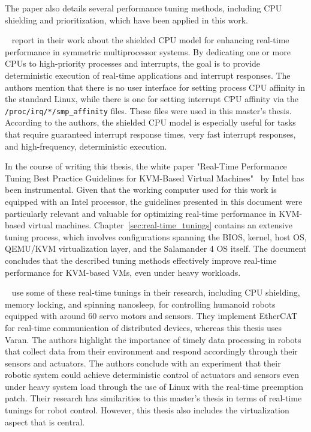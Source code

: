 \documentclass[MMR,Master,english]{style/twbook}
\begin{document}
\noindent The paper also details several performance tuning methods, including CPU shielding and prioritization, which have been applied in this work.

\clearpage

\bigskip \noindent \citeauthor{broskyShieldedProcessorsGuaranteeing2003}~\cite{broskyShieldedProcessorsGuaranteeing2003} report in their work about the shielded CPU model for enhancing real-time performance in symmetric multiprocessor systems. By dedicating one or more CPUs to high-priority processes and interrupts, the goal is to provide deterministic execution of real-time applications and interrupt responses. The authors mention that there is no user interface for setting process CPU affinity in the standard Linux, while there is one for setting interrupt CPU affinity via the \texttt{/proc/irq/*/smp\_affinity} files. These files were used in this master's thesis. According to the authors, the shielded CPU model is especially useful for tasks that require guaranteed interrupt response times, very fast interrupt responses, and high-frequency, deterministic execution.

\bigskip \noindent In the course of writing this thesis, the white paper "Real-Time Performance Tuning Best Practice Guidelines for KVM-Based Virtual Machines"~\cite{RealTimePerformanceTuning2022} by Intel has been instrumental. Given that the working computer used for this work is equipped with an Intel processor, the guidelines presented in this document were particularly relevant and valuable for optimizing real-time performance in KVM-based virtual machines. Chapter~\ref{sec:real-time_tunings} contains an extensive tuning process, which involves configurations spanning the BIOS, kernel, host OS, QEMU/KVM virtualization layer, and the Salamander 4 OS itself. The document concludes that the described tuning methods effectively improve real-time performance for KVM-based VMs, even under heavy workloads.

\bigskip \noindent \citeauthor{yoonRealTimePerformanceAnalysis2009}~\cite{yoonRealTimePerformanceAnalysis2009} use some of these real-time tunings in their research, including CPU shielding, memory locking, and spinning nanosleep, for controlling humanoid robots equipped with around 60 servo motors and sensors. They implement EtherCAT for real-time communication of distributed devices, whereas this thesis uses Varan. The authors highlight the importance of timely data processing in robots that collect data from their environment and respond accordingly through their sensors and actuators. The authors conclude with an experiment that their robotic system could achieve deterministic control of actuators and sensors even under heavy system load through the use of Linux with the real-time preemption patch. Their research has similarities to this master's thesis in terms of real-time tunings for robot control. However, this thesis also includes the virtualization aspect that is central.
\end{document}

